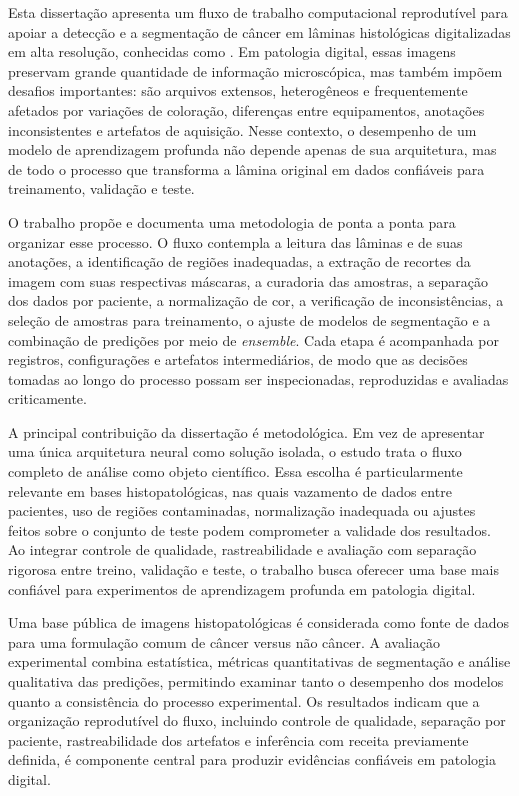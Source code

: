 \begin{resumo}
Esta dissertação apresenta um fluxo de trabalho computacional reprodutível para apoiar a detecção e a segmentação de câncer em lâminas histológicas digitalizadas em alta resolução, conhecidas como . Em patologia digital, essas imagens preservam grande quantidade de informação microscópica, mas também impõem desafios importantes: são arquivos extensos, heterogêneos e frequentemente afetados por variações de coloração, diferenças entre equipamentos, anotações inconsistentes e artefatos de aquisição. Nesse contexto, o desempenho de um modelo de aprendizagem profunda não depende apenas de sua arquitetura, mas de todo o processo que transforma a lâmina original em dados confiáveis para treinamento, validação e teste.

O trabalho propõe e documenta uma metodologia de ponta a ponta para organizar esse processo. O fluxo contempla a leitura das lâminas e de suas anotações, a identificação de regiões inadequadas, a extração de recortes da imagem com suas respectivas máscaras, a curadoria das amostras, a separação dos dados por paciente, a normalização de cor, a verificação de inconsistências, a seleção de amostras para treinamento, o ajuste de modelos de segmentação e a combinação de predições por meio de \textit{ensemble}. Cada etapa é acompanhada por registros, configurações e artefatos intermediários, de modo que as decisões tomadas ao longo do processo possam ser inspecionadas, reproduzidas e avaliadas criticamente.

A principal contribuição da dissertação é metodológica. Em vez de apresentar uma única arquitetura neural como solução isolada, o estudo trata o fluxo completo de análise como objeto científico. Essa escolha é particularmente relevante em bases histopatológicas, nas quais vazamento de dados entre pacientes, uso de regiões contaminadas, normalização inadequada ou ajustes feitos sobre o conjunto de teste podem comprometer a validade dos resultados. Ao integrar controle de qualidade, rastreabilidade e avaliação com separação rigorosa entre treino, validação e teste, o trabalho busca oferecer uma base mais confiável para experimentos de aprendizagem profunda em patologia digital.

Uma base pública de imagens histopatológicas é considerada como fonte de dados para uma formulação comum de câncer versus não câncer. A avaliação experimental combina estatística, métricas quantitativas de segmentação e análise qualitativa das predições, permitindo examinar tanto o desempenho dos modelos quanto a consistência do processo experimental. Os resultados indicam que a organização reprodutível do fluxo, incluindo controle de qualidade, separação por paciente, rastreabilidade dos artefatos e inferência com receita previamente definida, é componente central para produzir evidências confiáveis em patologia digital.
\end{resumo}


